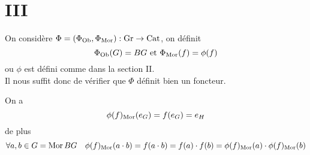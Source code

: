 \documentclass[11pt, a4paper]{article}
\begin{document}
\section*{III}
On considère $\Phi = ( \Phi_{\operatorname{Ob}} , \Phi_{\operatorname{Mor}} ) : \operatorname{Gr} \to \operatorname{Cat} $, on définit
\[ 
	\Phi_{\operatorname{Ob}} ( G) = BG \text{ et } \Phi_{\operatorname{Mor}} ( f) = \phi( f) 
\]
ou $\phi$ est défini comme dans la section II.\\
Il nous suffit donc de vérifier que $\Phi $ définit bien un foncteur.

On a 
\[ 
	\phi( f) _{\operatorname{Mor}} ( e_{G}  ) = f( e_{G} ) = e_{H} 
\]
de plus
\[ 
	\forall a,b \in G= \operatorname{Mor} BG\quad \phi( f) _{\operatorname{Mor}} ( a \cdot b) = f( a\cdot b ) = f( a) \cdot f( b) =\phi( f) _{\operatorname{Mor}} ( a) \cdot \phi ( f) _{\operatorname{Mor}} ( b) 
\]
\end{document}
